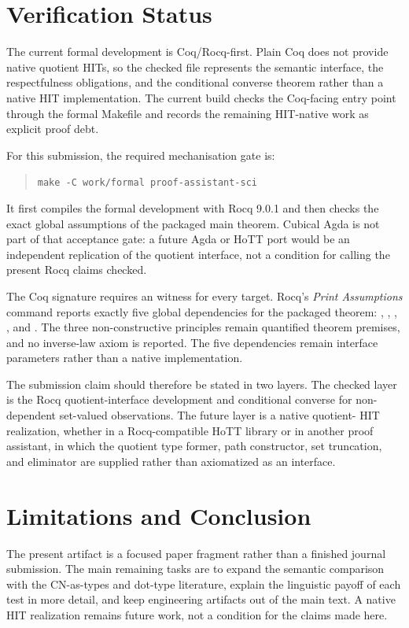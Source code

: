 \documentclass[11pt]{article}
\begin{document}
\section{Verification Status}

The current formal development is Coq/Rocq-first.  Plain Coq does not provide
native quotient HITs, so the checked file represents the semantic interface,
the respectfulness obligations, and the conditional converse theorem rather
than a native HIT implementation.  The current build checks the Coq-facing
entry point through the formal Makefile and records the remaining HIT-native
work as explicit proof debt.

For this submission, the required mechanisation gate is:
\begin{quote}
\small\texttt{make -C work/formal proof-assistant-sci}
\end{quote}
It first compiles the formal development with Rocq 9.0.1 and then checks the
exact global assumptions of the packaged main theorem.  Cubical Agda is not
part of that acceptance gate: a future Agda or HoTT port would be an
independent replication of the quotient interface, not a condition for calling
the present Rocq claims checked.

The Coq signature requires an  witness for every 
target.  Rocq's \emph{Print Assumptions} command reports exactly five global
dependencies for the packaged theorem: , , ,
, and .  The three non-constructive principles remain
quantified theorem premises, and no inverse-law axiom is reported.  The five
dependencies remain interface parameters rather than a native implementation.

The submission claim should therefore be stated in two layers.  The checked
layer is the Rocq quotient-interface development and conditional converse for
non-dependent set-valued observations.  The future layer is a native quotient-
HIT realization, whether in a Rocq-compatible HoTT library or in another proof
assistant, in which the quotient type former, path constructor, set
truncation, and eliminator are supplied rather than axiomatized as an
interface.

\section{Limitations and Conclusion}

The present artifact is a focused paper fragment rather than a finished journal
submission.  The main remaining tasks are to expand the semantic comparison
with the CN-as-types and dot-type literature, explain the linguistic payoff of
each test in more detail, and keep engineering artifacts out of the main text.
A native HIT realization remains future work, not a condition for the claims
made here.
\end{document}
